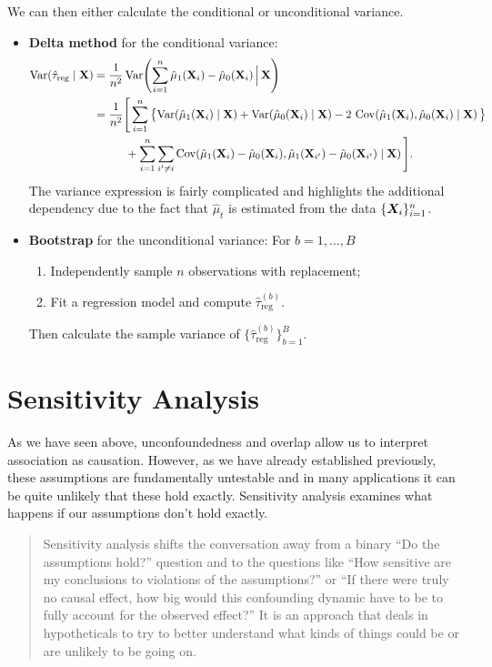 \documentclass[11pt]{exam}
\begin{document}
We can then either calculate the conditional or unconditional variance.
\begin{itemize}
\item \textbf{Delta method} for the conditional variance:
\[
\begin{aligned}
\mathrm{Var}\!\left(\hat{\tau}_{\mathrm{reg}} \mid \mathbf{X}\right)
&= \frac{1}{n^{2}}\,\mathrm{Var}\!\left(
\sum_{i=1}^{n} \hat{\mu}_{1}(\mathbf{X}_{i}) - \hat{\mu}_{0}(\mathbf{X}_{i})
\,\Big|\, \mathbf{X} \right) \\
&= \frac{1}{n^{2}} \Bigg[
\sum_{i=1}^{n} \big\{
\mathrm{Var}\!\left(\hat{\mu}_{1}(\mathbf{X}_{i}) \mid \mathbf{X}\right)
+ \mathrm{Var}\!\left(\hat{\mu}_{0}(\mathbf{X}_{i}) \mid \mathbf{X}\right)
- 2\,\operatorname{Cov}\!\left(\hat{\mu}_{1}(\mathbf{X}_{i}), \hat{\mu}_{0}(\mathbf{X}_{i}) \mid \mathbf{X}\right)
\big\} \\
&\hspace{2.8em}
+ \sum_{i=1}^{n}\sum_{i' \neq i}
\operatorname{Cov}\!\left(
\hat{\mu}_{1}(\mathbf{X}_{i}) - \hat{\mu}_{0}(\mathbf{X}_{i}),
\hat{\mu}_{1}(\mathbf{X}_{i'}) - \hat{\mu}_{0}(\mathbf{X}_{i'})
\mid \mathbf{X}
\right)
\Bigg].
\end{aligned}
\]
The variance expression is fairly complicated and highlights the additional dependency due to the fact that $\hat{\mu}_{t}$ is estimated from the data $\{\bm{X}_i\}_{i=1}^n$.
\item \textbf{Bootstrap} for the unconditional variance: For $b = 1, \ldots, B$
\begin{enumerate}
\item Independently sample $n$ observations with replacement;
\item Fit a regression model and compute $\hat{\tau}^{(b)}_{\mathrm{reg}}$.
\end{enumerate}
Then calculate the sample variance of $\{\hat{\tau}^{(b)}_{\mathrm{reg}}\}_{b=1}^B$. 
\end{itemize}

\section{Sensitivity Analysis}
As we have seen above, unconfoundedness and overlap allow us to interpret association as causation. However, as we have already established previously, these assumptions are fundamentally untestable and in many applications it can be quite unlikely that these hold exactly. Sensitivity analysis examines what happens if our assumptions don't hold exactly.

\begin{quote}
    Sensitivity analysis shifts the conversation away from a binary “Do the assumptions hold?” question and to the questions like “How sensitive are my conclusions to violations of the assumptions?” or “If there were truly no causal effect,
how big would this confounding dynamic have to be to fully account for the observed effect?” It is an approach that deals in
hypotheticals to try to better understand what kinds of things could be or are unlikely to be going on. \citet[p.~59]{chazal2024causalcoursenotes}
\end{quote}
\end{document}
